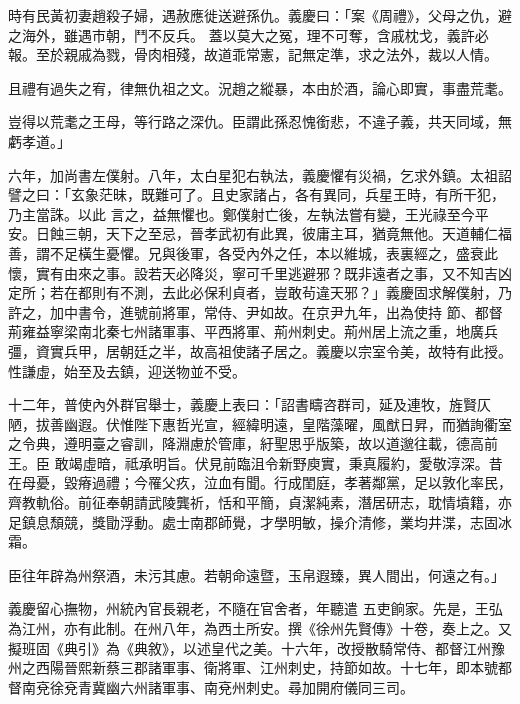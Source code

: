 \begin{pinyinscope}
 時有民黃初妻趙殺子婦，遇赦應徙送避孫仇。義慶曰：「案《周禮》，父母之仇，避之海外，雖遇市朝，鬥不反兵。
 蓋以莫大之冤，理不可奪，含戚枕戈，義許必報。至於親戚為戮，骨肉相殘，故道乖常憲，記無定準，求之法外，裁以人情。



 且禮有過失之宥，律無仇祖之文。況趙之縱暴，本由於酒，論心即實，事盡荒耄。



 豈得以荒耄之王母，等行路之深仇。臣謂此孫忍愧銜悲，不違子義，共天同域，無虧孝道。」



 六年，加尚書左僕射。八年，太白星犯右執法，義慶懼有災禍，乞求外鎮。太祖詔譬之曰：「玄象茫昧，既難可了。且史家諸占，各有異同，兵星王時，有所干犯，乃主當誅。以此
 言之，益無懼也。鄭僕射亡後，左執法嘗有變，王光祿至今平安。日蝕三朝，天下之至忌，晉孝武初有此異，彼庸主耳，猶竟無他。天道輔仁福善，謂不足橫生憂懼。兄與後軍，各受內外之任，本以維城，表裏經之，盛衰此懷，實有由來之事。設若天必降災，寧可千里逃避邪？既非遠者之事，又不知吉凶定所；若在都則有不測，去此必保利貞者，豈敢茍違天邪？」義慶固求解僕射，乃許之，加中書令，進號前將軍，常侍、尹如故。在京尹九年，出為使持
 節、都督荊雍益寧梁南北秦七州諸軍事、平西將軍、荊州刺史。荊州居上流之重，地廣兵彊，資實兵甲，居朝廷之半，故高祖使諸子居之。義慶以宗室令美，故特有此授。性謙虛，始至及去鎮，迎送物並不受。



 十二年，普使內外群官舉士，義慶上表曰：「詔書疇咨群司，延及連牧，旌賢仄陋，拔善幽遐。伏惟陛下惠哲光宣，經緯明遠，皇階藻曜，風猷日昇，而猶詢衢室之令典，遵明臺之睿訓，降淵慮於管庫，紆聖思乎版築，故以道邈往載，德高前王。臣
 敢竭虛暗，祗承明旨。伏見前臨沮令新野庾實，秉真履約，愛敬淳深。昔在母憂，毀瘠過禮；今罹父疚，泣血有聞。行成閨庭，孝著鄰黨，足以敦化率民，齊教軌俗。前征奉朝請武陵龔祈，恬和平簡，貞潔純素，潛居研志，耽情墳籍，亦足鎮息頹競，獎勖浮動。處士南郡師覺，才學明敏，操介清修，業均井渫，志固冰霜。



 臣往年辟為州祭酒，未污其慮。若朝命遠暨，玉帛遐臻，異人間出，何遠之有。」



 義慶留心撫物，州統內官長親老，不隨在官舍者，年聽遣
 五吏餉家。先是，王弘為江州，亦有此制。在州八年，為西土所安。撰《徐州先賢傳》十卷，奏上之。又擬班固《典引》為《典敘》，以述皇代之美。十六年，改授散騎常侍、都督江州豫州之西陽晉熙新蔡三郡諸軍事、衛將軍、江州刺史，持節如故。十七年，即本號都督南兗徐兗青冀幽六州諸軍事、南兗州刺史。尋加開府儀同三司。




\end{pinyinscope}

